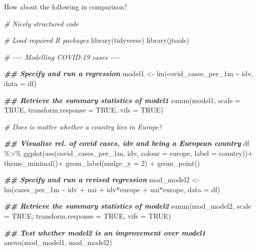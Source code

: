 \documentclass[
]{book}
\newenvironment{Shaded}{\begin{snugshade}}{\end{snugshade}}
\newcommand{\AttributeTok}[1]{\textcolor[rgb]{0.77,0.63,0.00}{#1}}
\newcommand{\CommentTok}[1]{\textcolor[rgb]{0.56,0.35,0.01}{\textit{#1}}}
\newcommand{\ConstantTok}[1]{\textcolor[rgb]{0.00,0.00,0.00}{#1}}
\newcommand{\DecValTok}[1]{\textcolor[rgb]{0.00,0.00,0.81}{#1}}
\newcommand{\DocumentationTok}[1]{\textcolor[rgb]{0.56,0.35,0.01}{\textbf{\textit{#1}}}}
\newcommand{\FunctionTok}[1]{\textcolor[rgb]{0.00,0.00,0.00}{#1}}
\newcommand{\NormalTok}[1]{#1}
\newcommand{\OtherTok}[1]{\textcolor[rgb]{0.56,0.35,0.01}{#1}}
\newcommand{\SpecialCharTok}[1]{\textcolor[rgb]{0.00,0.00,0.00}{#1}}
\begin{document}
How about the following in comparison?

\begin{Shaded}
\begin{Highlighting}[]
\CommentTok{\# Nicely structured code}

\CommentTok{\# Load required R packages}
\FunctionTok{library}\NormalTok{(tidyverse)}
\FunctionTok{library}\NormalTok{(jtools)}

\CommentTok{\# {-}{-}{-}{-} Modelling COVID{-}19 cases {-}{-}{-}{-}}

\DocumentationTok{\#\# Specify and run a regression}
\NormalTok{model1 }\OtherTok{\textless{}{-}} \FunctionTok{lm}\NormalTok{(covid\_cases\_per\_1m }\SpecialCharTok{\textasciitilde{}}\NormalTok{ idv, }\AttributeTok{data =}\NormalTok{ df)}

\DocumentationTok{\#\# Retrieve the summary statistics of model1}
\FunctionTok{summ}\NormalTok{(model1, }\AttributeTok{scale =} \ConstantTok{TRUE}\NormalTok{, }\AttributeTok{transform.response =} \ConstantTok{TRUE}\NormalTok{, }\AttributeTok{vifs =} \ConstantTok{TRUE}\NormalTok{)}

\CommentTok{\# Does is matter whether a country lies in Europe?}

\DocumentationTok{\#\# Visualise rel. of covid cases, idv and being a European country}
\NormalTok{df }\SpecialCharTok{\%\textgreater{}\%}
  \FunctionTok{ggplot}\NormalTok{(}\FunctionTok{aes}\NormalTok{(covid\_cases\_per\_1m, idv, }\AttributeTok{colour =}\NormalTok{ europe, }\AttributeTok{label =}\NormalTok{ country))}\SpecialCharTok{+}
  \FunctionTok{theme\_minimal}\NormalTok{()}\SpecialCharTok{+}
  \FunctionTok{geom\_label}\NormalTok{(}\AttributeTok{nudge\_y =} \DecValTok{2}\NormalTok{) }\SpecialCharTok{+}
  \FunctionTok{geom\_point}\NormalTok{()}

\DocumentationTok{\#\# Specify and run a revised regression}
\NormalTok{mod\_model2 }\OtherTok{\textless{}{-}} \FunctionTok{lm}\NormalTok{(cases\_per\_1m }\SpecialCharTok{\textasciitilde{}}\NormalTok{ idv }\SpecialCharTok{+}\NormalTok{ uai }\SpecialCharTok{+}\NormalTok{ idv}\SpecialCharTok{*}\NormalTok{europe }\SpecialCharTok{+}\NormalTok{ uai}\SpecialCharTok{*}\NormalTok{europe, }\AttributeTok{data =}\NormalTok{ df)}

\DocumentationTok{\#\# Retrieve the summary statistics of model2}
\FunctionTok{summ}\NormalTok{(mod\_model2, }\AttributeTok{scale =} \ConstantTok{TRUE}\NormalTok{, }\AttributeTok{transform.response =} \ConstantTok{TRUE}\NormalTok{, }\AttributeTok{vifs =} \ConstantTok{TRUE}\NormalTok{)}

\DocumentationTok{\#\# Test whether model2 is an improvement over model1}
\FunctionTok{anova}\NormalTok{(mod\_model1, mod\_model2)}
\end{Highlighting}
\end{Shaded}
\end{document}
